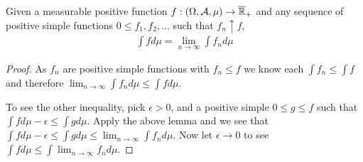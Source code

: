 \begin{cor}Given a measurable positive function $f : (\Omega, \mathcal{A},
  \mu) \to \overline{\mathbb{R}}_+$ and any sequence of positive simple functions $0 \leq f_1,
  f_2, \dots$ such that $f_n \uparrow f$, 
\begin{align*}
\int f d \mu = \lim_{n \to \infty} \int f_n d\mu
\end{align*}
\end{cor}
\begin{proof}As $f_n$ are positive simple functions with $f_n \leq f$
  we know each $\int f_n \leq \int f$ and therefore $\lim_{n \to \infty} \int f_n
  d\mu \leq \int f d \mu$.  

To see the other inequality, pick $\epsilon > 0$, and a positive
simple $0 \leq g \leq f$ such that $\int f d \mu - \epsilon \leq \int
g d \mu$.  Apply the above lemma and we see that $\int f d \mu - \epsilon \leq \int
g d \mu \leq \lim_{n \to \infty} \int f_n d \mu$.  Now let $\epsilon \to 0$ to see $\int f d \mu
\leq \int \lim_{n \to \infty} f_n d \mu$.
\end{proof}

